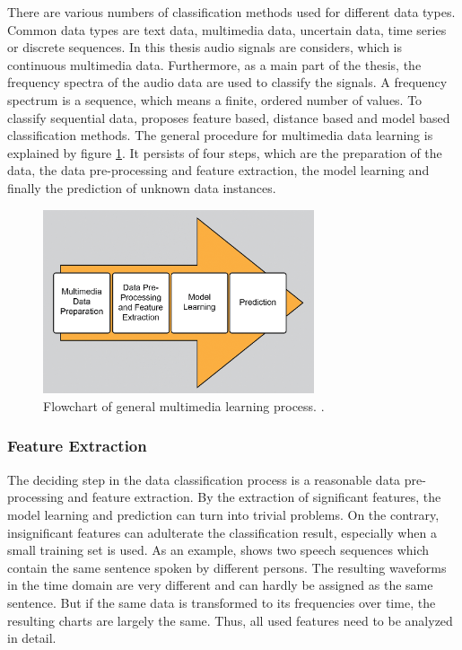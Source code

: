 There are various numbers of classification methods used for different data types. Common data types are text data, multimedia data, uncertain data, time series or discrete sequences. In this thesis audio signals are considers, which is continuous multimedia data. Furthermore, as a main part of the thesis, the frequency spectra of the audio data are used to classify the signals. A frequency spectrum is a sequence, which means a finite, ordered number of values. To classify sequential data, \autocite{Chapman:2015} proposes feature based, distance based and model based classification methods. The general procedure for multimedia data learning is explained by figure \ref{fig:datalearning}. It persists of four steps, which are the preparation of the data, the data pre-processing and feature extraction, the model learning and finally the prediction of unknown data instances.

\begin{figure}[h]
	\centering
	\includegraphics[width=8.0cm]{images/datalearning.png}
	\caption{Flowchart of general multimedia learning process. \autocite[Fig. 12.1]{Chapman:2015}.}
	\label{fig:datalearning}
\end{figure}

\subsubsection{Feature Extraction}

The deciding step in the data classification process is a reasonable data pre-processing and feature extraction. By the extraction of significant features, the model learning and prediction can turn into trivial problems. On the contrary, insignificant features can adulterate the classification result, especially when a small training set is used. As an example, \autocite{Chapman:2015} shows two speech sequences which contain the same sentence spoken by different persons. The resulting waveforms in the time domain are very different and can hardly be assigned as the same sentence. But if the same data is transformed to its frequencies over time, the resulting charts are largely the same. Thus, all used features need to be analyzed in detail.

